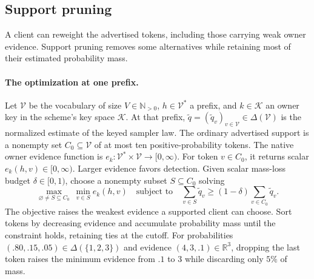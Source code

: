 \subsection{Support pruning}
\label{app:support_guard}
A client can reweight the advertised tokens, including those carrying weak owner evidence. Support pruning removes some alternatives while retaining most of their estimated probability mass.

\paragraph{The optimization at one prefix.}
Let $\mathcal V$ be the vocabulary of size $V\in\mathbb N_{>0}$, $h\in\mathcal V^*$ a prefix, and $k\in\mathcal K$ an owner key in the scheme's key space $\mathcal K$. At that prefix, $\widetilde q=(\widetilde q_v)_{v\in\mathcal V}\in\Delta(\mathcal V)$ is the normalized estimate of the keyed sampler law. The ordinary advertised support is a nonempty set $C_0\subseteq\mathcal V$ of at most ten positive-probability tokens. The native owner evidence function is $e_k:\mathcal V^*\times\mathcal V\to[0,\infty)$. For token $v\in C_0$, it returns scalar $e_k(h,v)\in[0,\infty)$. Larger evidence favors detection. Given scalar mass-loss budget $\delta\in[0,1)$, choose a nonempty subset $S\subseteq C_0$ solving
\begin{equation}
\label{eq:pruning-objective}
 \max_{\varnothing\ne S\subseteq C_0}\ \min_{v\in S}e_k(h,v)
 \quad\text{subject to}\quad
 \sum_{v\in S}\widetilde q_v\geq
 (1-\delta)\sum_{v\in C_0}\widetilde q_v.
\end{equation}
The objective raises the weakest evidence a supported client can choose. Sort tokens by decreasing evidence and accumulate probability mass until the constraint holds, retaining ties at the cutoff. For probabilities $(.80,.15,.05)\in\Delta(\{1,2,3\})$ and evidence $(4,3,.1)\in\mathbb R^3$, dropping the last token raises the minimum evidence from $.1$ to $3$ while discarding only $5\%$ of mass.

